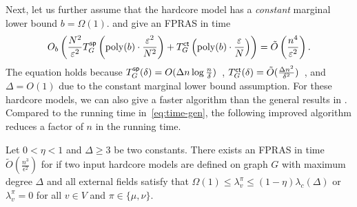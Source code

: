 Next, let us further assume that the hardcore model has a \emph{constant} marginal lower bound $b = \Omega(1)$. 
 and  give an FPRAS in time 
\begin{align}\label{eq:time-gen}
O_b\left(\frac{N^2}{\varepsilon^2} T^{\textsf{sp}}_G \left(\mathrm{poly}(b) \cdot \frac{\varepsilon^2}{ N^2}\right) + T^{\textsf{ct}}_G\left(\mathrm{poly}(b) \cdot \frac{\varepsilon}{ N}\right)\right) = \tilde{O} \left(\frac{n^4}{\varepsilon^2}\right).  
\end{align}
The equation holds because $T^{\textsf{sp}}_G(\delta) = O(\Delta n\log\frac{n}{\delta})$~\cite{CFYZ22,CE22}, $T^{\textsf{ct}}_G(\delta) = \tilde{O}(\frac{\Delta n^2}{\delta^2})$~\cite{SVV09}, and $\Delta = O(1)$ due to the constant marginal lower bound assumption. For these hardcore models, we can also give a faster algorithm than the general results in .
Compared to the running time in~\eqref{eq:time-gen}, the following improved algorithm reduces a factor of $n$ in the running time.  


\begin{theorem}\label{thm:hardcore-2}
Let $0 < \eta < 1$ and $\Delta \geq 3$ be two constants.
There exists an FPRAS in time $\tilde{O}(\frac{n^3}{\epsilon^2})$ for  if two input hardcore models are defined on graph $G$ with maximum degree $\Delta$ and all external fields satisfy that $\Omega(1) \leq \lambda^\pi_v \leq (1 - \eta)\lambda_c(\Delta)$ or $\lambda^\pi_v = 0$ for all $v \in V$ and $\pi \in \{\mu,\nu\}$.
\end{theorem}







